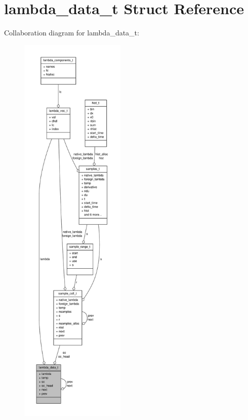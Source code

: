 \hypertarget{structlambda__data__t}{\section{lambda\-\_\-data\-\_\-t \-Struct \-Reference}
\label{structlambda__data__t}
}


\-Collaboration diagram for lambda\-\_\-data\-\_\-t\-:
\nopagebreak
\begin{figure}[H]
\begin{center}
\leavevmode
\includegraphics[height=550pt]{structlambda__data__t__coll__graph}
\end{center}
\end{figure}
